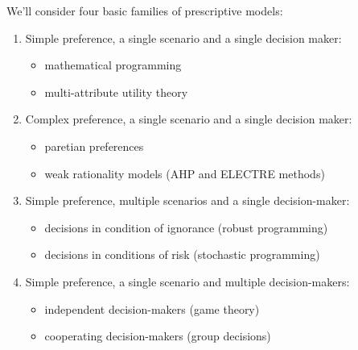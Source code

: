 We'll consider four basic families of prescriptive models: 
\begin{enumerate}
	\item Simple preference, a single scenario and a single decision maker:
	\begin{itemize}
		\item mathematical programming
		
		\item multi-attribute utility theory
	\end{itemize}
	
	\item Complex preference, a single scenario and a single decision maker:
	\begin{itemize}
		\item paretian preferences
		
		\item weak rationality models (AHP and ELECTRE methods)
	\end{itemize}
	
	\item Simple preference, multiple scenarios and a single decision-maker:
	\begin{itemize}
		\item decisions in condition of ignorance (robust programming)
		
		\item decisions in conditions of risk (stochastic programming)
	\end{itemize}
	
	\item Simple preference, a single scenario and multiple decision-makers: 
	\begin{itemize}
		\item independent decision-makers (game theory)
		
		\item cooperating decision-makers (group decisions)
	\end{itemize}
\end{enumerate}